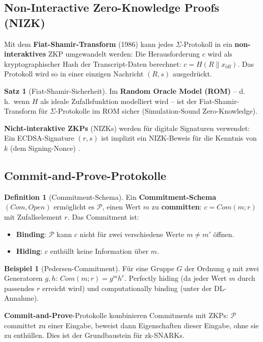 ﻿\documentclass[a4paper,12pt]{scrreprt}
\theoremstyle{definition}
\newtheorem{definition}{Definition}[section]
\newtheorem{beispiel}{Beispiel}[section]
\newtheorem{satz}{Satz}[section]
\begin{document}
\subsection{Non-Interactive Zero-Knowledge Proofs (NIZK)}

Mit dem \textbf{Fiat-Shamir-Transform} (1986) kann jedes $\Sigma$-Protokoll in ein \textbf{non-interakti\-ves} ZKP umgewandelt werden: Die Herausforderung $c$ wird als kryptographischer Hash der Transcript-Daten berechnet: $c = H(R \| x_{\text{öff}})$. Das Protokoll wird so in einer einzigen Nachricht $(R, s)$ ausgedrückt.

\begin{satz}[Fiat-Shamir-Sicherheit]
Im \textbf{Random Oracle Model (ROM)} -- d.\,h.\ wenn $H$ als ideale Zufallsfunktion modelliert wird -- ist der Fiat-Shamir-Transform für $\Sigma$-Protokolle im ROM sicher (Simulation-Sound Zero-Knowledge).
\end{satz}

\textbf{Nicht-interaktive ZKPs} (NIZKs) werden für digitale Signaturen verwendet: Ein ECDSA-Signature $(r, s)$ ist implizit ein NIZK-Beweis für die Kenntnis von $k$ (dem Signing-Nonce) \cite{GMR88}.

\subsection{Commit-and-Prove-Protokolle}

\begin{definition}[Commitment-Schema]
Ein \textbf{Commitment-Schema} $(Com, Open)$ ermöglicht es $\mathcal{P}$, einen Wert $m$ zu \textbf{committen}: $c = Com(m; r)$ mit Zufallselement $r$. Das Commitment ist:
\begin{itemize}
    \item \textbf{Binding}: $\mathcal{P}$ kann $c$ nicht für zwei verschiedene Werte $m \neq m'$ öffnen.
    \item \textbf{Hiding}: $c$ enthüllt keine Information über $m$.
\end{itemize}
\end{definition}

\begin{beispiel}[Pedersen-Commitment]
Für eine Gruppe $G$ der Ordnung $q$ mit zwei Generatoren $g, h$: $Com(m; r) = g^m h^r$. Perfectly hiding (da jeder Wert $m$ durch passendes $r$ erreicht wird) und computationally binding (unter der DL-Annahme).
\end{beispiel}

\textbf{Commit-and-Prove}-Protokolle kombinieren Commitments mit ZKPs: $\mathcal{P}$ committet zu einer Eingabe, beweist dann Eigenschaften dieser Eingabe, ohne sie zu enthüllen. Dies ist der Grundbaustein für zk-SNARKs.
\end{document}
